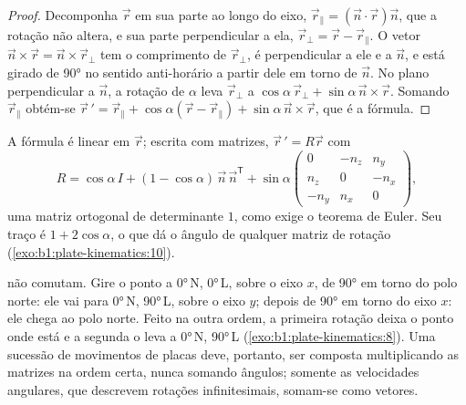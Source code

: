 \begin{proof}
Decomponha $\vec r$ em sua parte ao longo do eixo, $\vec r_\parallel =
(\vec n\cdot\vec r)\vec n$, que a rotação não altera, e sua parte
perpendicular a ela, $\vec r_\perp = \vec r - \vec r_\parallel$. O vetor
$\vec n\times\vec r = \vec n\times\vec r_\perp$ tem o comprimento de $\vec r_\perp$,
é perpendicular a ele e a $\vec n$, e está girado de \ang{90} no sentido anti-horário a partir
dele em torno de $\vec n$. No plano perpendicular a $\vec n$, a rotação de
$\alpha$ leva $\vec r_\perp$ a $\cos\alpha\,\vec r_\perp +
\sin\alpha\,\vec n\times\vec r$. Somando $\vec r_\parallel$ obtém-se $\vec r\,' =
\vec r_\parallel + \cos\alpha(\vec r - \vec r_\parallel) + \sin\alpha\,
\vec n\times\vec r$, que é a fórmula.
\end{proof}

A fórmula é linear em $\vec r$; escrita com matrizes, $\vec r\,' = R\vec r$
com
\[
  R = \cos\alpha\,I + (1 - \cos\alpha)\,\vec n\,\vec n^{\mathsf T}
  + \sin\alpha
  \begin{pmatrix} 0 & -n_z & n_y\\ n_z & 0 & -n_x\\ -n_y & n_x & 0\end{pmatrix},
\]
uma matriz ortogonal de determinante $1$, como exige o teorema de Euler. Seu traço
é $1 + 2\cos\alpha$, o que dá o ângulo de qualquer matriz de rotação
(\cref{exo:b1:plate-kinematics:10}).

 não comutam. Gire o ponto a \ang{0}\,N, \ang{0}\,L, sobre o
eixo $x$, de \ang{90} em torno do polo norte: ele vai para \ang{0}\,N,
\ang{90}\,L, sobre o eixo $y$; depois de \ang{90} em torno do eixo $x$: ele chega
ao polo norte. Feito na outra ordem, a primeira rotação deixa o ponto
onde está e a segunda o leva a \ang{0}\,N, \ang{90}\,L (\cref{exo:b1:plate-kinematics:8}).
Uma sucessão de movimentos de placas deve, portanto, ser composta multiplicando as
matrizes na ordem certa, nunca somando ângulos; somente as velocidades angulares,
que descrevem rotações infinitesimais, somam-se como vetores.

